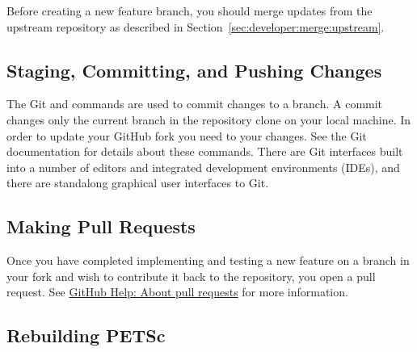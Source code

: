 Before creating a new feature branch, you should merge updates from
the upstream repository as described in Section~\vref{sec:developer:merge:upstream}.


\subsection{Staging, Committing, and Pushing Changes}
\label{sec:developer:commit}

The Git  and  commands are used
to commit changes to a branch. A commit changes only the current
branch in the repository clone on your local machine. In order to
update your GitHub fork you need to  your
changes. See the Git documentation for details about these
commands. There are Git interfaces built into a number of editors and
integrated development environments (IDEs), and there are standalong
graphical user interfaces to Git.


\subsection{Making Pull Requests}
\label{sec:developer:create:pull:request}

Once you have completed implementing and testing a new feature on a
branch in your fork and wish to contribute it back to the
 repository, you open a pull
request. See
\href{https://help.github.com/articles/about-pull-requests/}{GitHub
  Help: About pull requests} for more information.


\subsection{Rebuilding PETSc}

